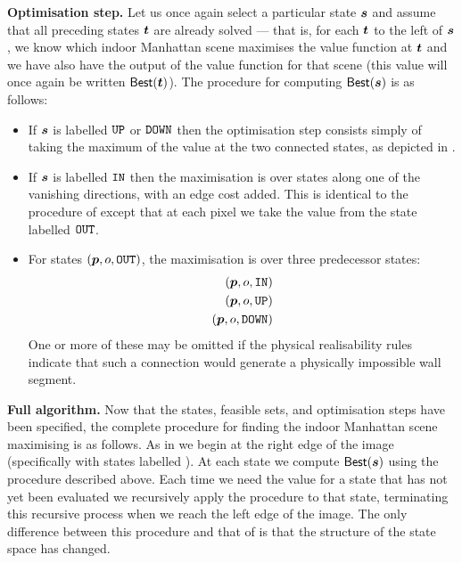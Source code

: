 \textbf{Optimisation step.} Let us once again select a particular
state $\State$ and assume that all preceding states $\OtherState$ are
already solved --- that is, for each $\OtherState$ to the left of
$\State$, we know which indoor Manhattan scene maximises the value
function at $\OtherState$ and we have also have the output of the
value function for that scene (this value will once again be written
$\SubProb(\OtherState)$). The procedure for computing
$\SubProb(\State)$ is as follows:
\begin{itemize}
  \item{If $\State$ is labelled $\UPlabel$ or $\DOWNlabel$ then the
    optimisation step consists simply of taking the maximum of the
    value at the two connected states, as depicted in
    .}
  \item{If $\State$ is labelled $\INlabel$ then the maximisation is
    over states along one of the vanishing directions, with an edge
    cost added. This is identical to the procedure of
     except that at each pixel we take the value
    from the state labelled $\OUTlabel$.}
  \item{For states $(\Pixel,\WallOrient,\OUTlabel)$, the maximisation
    is over three predecessor states:
    \begin{eqnarray*}
      (\Pixel,\WallOrient,\INlabel) \\
      (\Pixel,\WallOrient,\UPlabel) \\
      (\Pixel,\WallOrient,\DOWNlabel)
    \end{eqnarray*}
    One or more of these may be omitted if the physical
    realisability rules indicate that such a connection would generate
    a physically impossible wall segment.}
\end{itemize}

\textbf{Full algorithm.} Now that the states, feasible sets, and
optimisation steps have been specified, the complete procedure for
finding the indoor Manhattan scene maximising  is
as follows. As in  we begin at the right edge of the
image (specifically with states labelled \INlabel). At each state we
compute $\SubProb(\State)$ using the procedure described above. Each
time we need the value for a state that has not yet been evaluated we
recursively apply the procedure to that state, terminating this
recursive process when we reach the left edge of the image. The only
difference between this procedure and that of  is
that the structure of the state space has changed.

